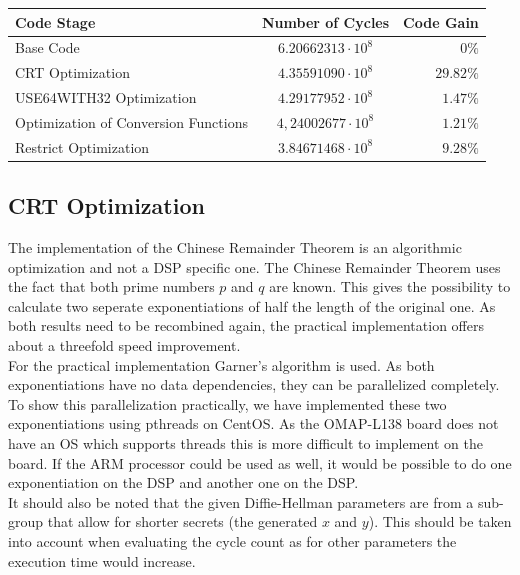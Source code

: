 \documentclass[a4paper]{article}
\begin{document}
\begin{center}
    \begin{tabular}{| l | c | r |}
        \hline
        Code Stage & Number of Cycles & Code Gain \\ \hline
        Base Code & $6.20662313 \cdot 10^{8}$ 	& $0\%$ \\
        CRT Optimization & $4.35591090 \cdot 10^{8}$ & $29.82\%$ \\
        USE64WITH32 Optimization 	& $4.29177952 \cdot 10^{8}$ & $1.47\%$ \\
        Optimization of Conversion Functions & $4,24002677 \cdot 10^{8}$ & $1.21\%$ \\
        Restrict Optimization	 & $3.84671468 \cdot 10^{8}$ & $9.28\%$ \\
        \hline
    \end{tabular}
\end{center}

\subsection{CRT Optimization}

The implementation of the Chinese Remainder Theorem is an algorithmic optimization and not a DSP specific one. The Chinese Remainder Theorem uses the fact that both prime numbers $p$ and $q$ are known. This gives the possibility to calculate two seperate exponentiations of half the length of the original one. As both results need to be recombined again, the practical implementation offers about a threefold speed improvement.\\

For the practical implementation Garner's algorithm is used. As both exponentiations have no data dependencies, they can be parallelized completely. To show this parallelization practically, we have implemented these two exponentiations using pthreads on CentOS. As the OMAP-L138 board does not have an OS which supports threads this is more difficult to implement on the board. If the ARM processor could be used as well, it would be possible to do one exponentiation on the DSP and another one on the DSP.\\

It should also be noted that the given Diffie-Hellman parameters are from a sub-group that allow for shorter secrets (the generated $x$ and $y$). This should be taken into account when evaluating the cycle count as for other parameters the execution time would increase.
\end{document}
